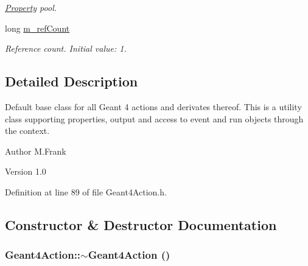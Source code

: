 \begin{DoxyCompactItemize}
\begin{DoxyCompactList}\small\item\em \hyperlink{class_d_d4hep_1_1_property}{Property} pool. \item\end{DoxyCompactList}\item 
long \hyperlink{class_d_d4hep_1_1_simulation_1_1_geant4_action_a5ea9f95e6db274a1515b947b4f69da9e}{m\_\-refCount}
\begin{DoxyCompactList}\small\item\em Reference count. Initial value: 1. \item\end{DoxyCompactList}\end{DoxyCompactItemize}


\subsection{Detailed Description}
Default base class for all Geant 4 actions and derivates thereof. This is a utility class supporting properties, output and access to event and run objects through the context.

\begin{DoxyAuthor}{Author}
M.Frank 
\end{DoxyAuthor}
\begin{DoxyVersion}{Version}
1.0 
\end{DoxyVersion}


Definition at line 89 of file Geant4Action.h.

\subsection{Constructor \& Destructor Documentation}
\hypertarget{class_d_d4hep_1_1_simulation_1_1_geant4_action_af1ba7438be6c70743727ce6606c5f76a}{
\subsubsection[{$\sim$Geant4Action}]{\setlength{\rightskip}{0pt plus 5cm}Geant4Action::$\sim$Geant4Action ()}}
\label{class_d_d4hep_1_1_simulation_1_1_geant4_action_af1ba7438be6c70743727ce6606c5f76a}


